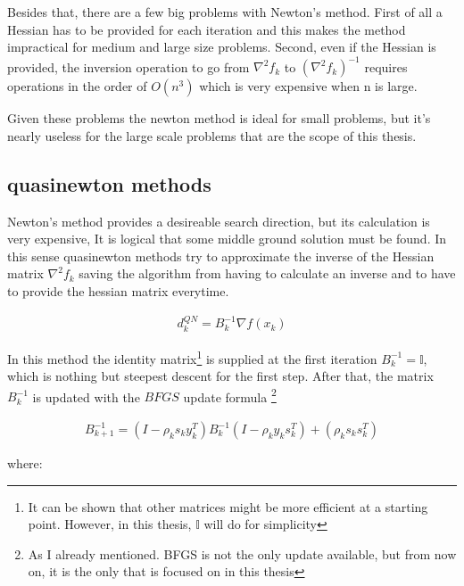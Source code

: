 Besides that, there are a few big problems with Newton's method.  First of all a Hessian has to be provided for each iteration and this makes the method impractical for medium and large size problems.  Second, even if the Hessian is provided, the inversion operation to go from $\nabla^2 f_k$ to $\left(\nabla^2 f_k \right)^{-1}$ requires operations in the order of $O(n^3)$ which is very expensive when n is large.

Given these problems the newton method is ideal for small problems, but it's nearly useless for the large scale problems that are the scope of this thesis.

\subsection{quasinewton methods}

Newton's method provides a desireable search direction, but its calculation is very expensive, It is logical that some middle ground solution must be found.  In this sense quasinewton methods try to approximate the inverse of the Hessian matrix $\nabla^2 f_k$ saving the algorithm from having to calculate an inverse and to have to provide the hessian matrix everytime.

\begin{equation}
  \begin{aligned}
    d_k^{QN} = B_k^{-1} \nabla f(x_k)
  \end{aligned}
\end{equation}

In this method the identity matrix\footnote{It can be shown that other matrices might be more efficient at a starting point.  However, in this thesis, $\mathbb{I}$ will do for simplicity} is supplied at the first iteration $B_k^{-1} = \mathbb{I}$, which is nothing but steepest descent for the first step.  After that, the matrix $B_k^{-1}$ is updated with the $BFGS$ update formula \footnote{As I already mentioned.  BFGS is not the only update available, but from now on, it is the only that is focused on in this thesis}

\begin{equation} \label{BFGSUpdate}
  \begin{aligned}
    B_{k+1} ^{-1} = (I - \rho_k s_k y_k^T) B_k^{-1} (I - \rho_k y_k s_k^T) + (\rho_k s_k s_k^T)
  \end{aligned}
\end{equation} 

where:

